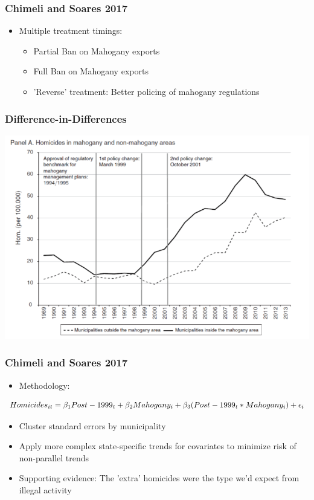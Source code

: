 \documentclass[xcolor=x11names,compress]{beamer}\usepackage[]{graphicx}\usepackage[]{color}
\renewcommand{\(}{\begin{columns}}
\renewcommand{\)}{\end{columns}}
\newcommand{\<}[1]{\begin{column}{#1}}
\renewcommand{\>}{\end{column}}
\begin{document}
\begin{frame}
\frametitle{Chimeli and Soares 2017}
\begin{itemize}
\item Multiple treatment timings:
\begin{itemize}
\item Partial Ban on Mahogany exports
\item Full Ban on Mahogany exports
\item 'Reverse' treatment: Better policing of mahogany regulations
\end{itemize}
\end{itemize}
\end{frame}

\begin{frame}
\frametitle{Difference-in-Differences}
\begin{center}
\includegraphics[scale=0.35]{Mahogany.png}
\end{center}
\end{frame}

\begin{frame}
\frametitle{Chimeli and Soares 2017}
\begin{itemize}
\item Methodology:
\pause
\end{itemize}
$$ Homicides_{it} = \beta_1 Post-1999_t + \beta_2 Mahogany_i \\ + \beta_3 (Post-1999_t *  Mahogany_i) + \epsilon_i$$
\pause
\begin{itemize}
\item Cluster standard errors by municipality
\pause
\item Apply more complex state-specific trends for covariates to minimize risk of non-parallel trends
\pause
\item Supporting evidence: The 'extra' homicides were the type we'd expect from illegal activity
\end{itemize}
\end{frame}
\end{document}
